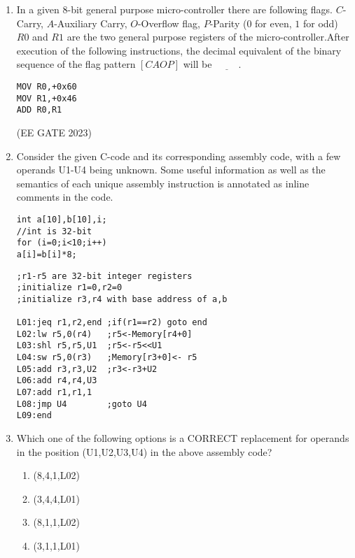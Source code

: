 \begin{enumerate}
\item In a given $8$-bit general purpose micro-controller there are following flags. $C$-Carry, $A$-Auxiliary Carry, $O$-Overflow flag, $P$-Parity ($0$ for even, $1$ for odd) $R0$ and $R1$ are the two general purpose registers of the micro-controller.After execution of the following instructions, the decimal equivalent of the binary sequence of the flag pattern $[CAOP]$ will be $\underline{\hspace{1cm}}$.\\


\begin{lstlisting}
MOV R0,+0x60
MOV R1,+0x46 
ADD R0,R1
\end{lstlisting}
    
\hfill{(EE GATE 2023)}\\


\item 
Consider the given C-code and its corresponding assembly code, with a few operands U1-U4 being unknown. Some useful information as well as the semantics of each unique assembly instruction is annotated as inline comments in the code.

\begin{lstlisting}
int a[10],b[10],i;
//int is 32-bit
for (i=0;i<10;i++)
a[i]=b[i]*8;
\end{lstlisting}

\begin{lstlisting}
;r1-r5 are 32-bit integer registers
;initialize r1=0,r2=0
;initialize r3,r4 with base address of a,b

L01:jeq r1,r2,end ;if(r1==r2) goto end
L02:lw r5,0(r4)   ;r5<-Memory[r4+0]
L03:shl r5,r5,U1  ;r5<-r5<<U1
L04:sw r5,0(r3)   ;Memory[r3+0]<- r5
L05:add r3,r3,U2  ;r3<-r3+U2
L06:add r4,r4,U3
L07:add r1,r1,1
L08:jmp U4        ;goto U4
L09:end
\end{lstlisting}

\item Which one of the following options is a CORRECT replacement 
for operands in the position (U1,U2,U3,U4) in the above 
assembly code?

\begin{enumerate}
\item (8,4,1,L02)                      
\item (3,4,4,L01)
\item (8,1,1,L02)                             
\item (3,1,1,L01)         
\end{enumerate}

\end{enumerate}
